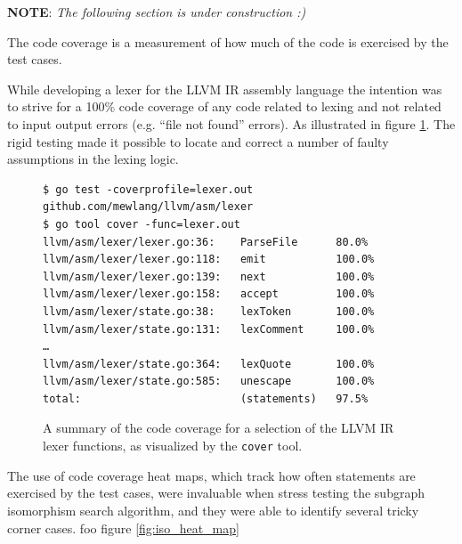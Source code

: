\textbf{NOTE}: \textit{The following section is under construction :)}


The code coverage is a measurement of how much of the code is exercised by the test cases.


While developing a lexer for the LLVM IR assembly language the intention was to strive for a 100\% code coverage of any code related to lexing and not related to input output errors (e.g. ``file not found'' errors). As illustrated in figure \ref{fig:lexer_code_coverage}. The rigid testing made it possible to locate and correct a number of faulty assumptions in the lexing logic.

\begin{figure}[htbp]
	\begin{center}
		\begin{verbatim}
$ go test -coverprofile=lexer.out github.com/mewlang/llvm/asm/lexer
$ go tool cover -func=lexer.out
llvm/asm/lexer/lexer.go:36:    ParseFile      80.0%
llvm/asm/lexer/lexer.go:118:   emit           100.0%
llvm/asm/lexer/lexer.go:139:   next           100.0%
llvm/asm/lexer/lexer.go:158:   accept         100.0%
llvm/asm/lexer/state.go:38:    lexToken       100.0%
llvm/asm/lexer/state.go:131:   lexComment     100.0%
…
llvm/asm/lexer/state.go:364:   lexQuote       100.0%
llvm/asm/lexer/state.go:585:   unescape       100.0%
total:                         (statements)   97.5%
		\end{verbatim}
		\caption{A summary of the code coverage for a selection of the LLVM IR lexer functions, as visualized by the \texttt{cover} tool.}
		\label{fig:lexer_code_coverage}
	\end{center}
\end{figure}

The use of code coverage heat maps, which track how often statements are exercised by the test cases, were invaluable when stress testing the subgraph isomorphism search algorithm, and they were able to identify several tricky corner cases. foo figure \ref{fig:iso_heat_map}

